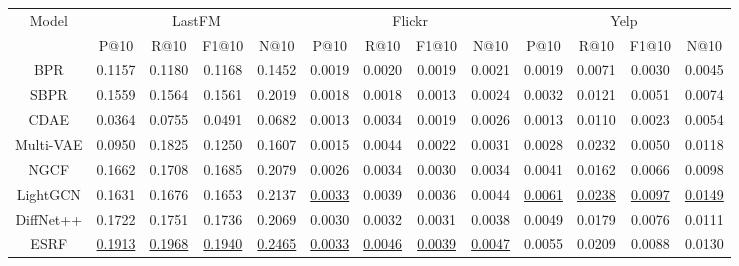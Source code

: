 \documentclass[letterpaper]{article} %
\begin{document}
\begin{table}[ht]\small
    \begin{tabular*}{\textwidth}{@{\extracolsep{\fill}}ccccc|cccc|cccc}
        \cmidrule(l){1-13}
        \multirow{2}{*}{Model} & \multicolumn{4}{c}{LastFM} & \multicolumn{4}{c}{Flickr} & \multicolumn{4}{c}{Yelp} \\ \cmidrule(l){2-5} \cmidrule(l){6-9} \cmidrule(l){10-13} \cmidrule(l){10-13}
            & P@10  & R@10  & F1@10  & N@10 & P@10  & R@10 & F1@10  & N@10 & P@10 & R@10 & F1@10  & N@10 \\ \cmidrule(l){1-13}
            BPR             &0.1157 &0.1180 &0.1168 &0.1452     &0.0019 &0.0020 &0.0019 &0.0021     &0.0019 &0.0071 &0.0030 &0.0045\\
            
            SBPR            &0.1559 &0.1564 &0.1561 &0.2019     &0.0018 &0.0018 &0.0013 &0.0024     &0.0032 &0.0121 &0.0051 &0.0074\\ \cmidrule(l){1-13}
            
            CDAE        &0.0364 &0.0755 &0.0491 &0.0682     &0.0013 &0.0034 &0.0019 &0.0026     &0.0013 &0.0110 &0.0023 &0.0054 \\
            
            Multi-VAE   &0.0950 &0.1825 &0.1250 &0.1607     &0.0015 &0.0044&0.0022 &0.0031     &0.0028 &0.0232 &0.0050 &0.0118 \\ \cmidrule(l){1-13}
            
            NGCF        &0.1662 &0.1708 &0.1685 &0.2079     &0.0026 &0.0034 &0.0030 &0.0034     &0.0041 &0.0162 &0.0066 &0.0098 \\
            
            LightGCN        &0.1631 &0.1676 &0.1653 &0.2137     &\underline{0.0033} &0.0039 &0.0036 &0.0044     &\underline{0.0061} &\underline{0.0238} &\underline{0.0097} &\underline{0.0149} \\ \cmidrule(l){1-13}
            
            DiffNet++            &0.1722 &0.1751 &0.1736 &0.2069     &0.0030 &0.0032 &0.0031 &0.0038     &0.0049 &0.0179 &0.0076 &0.0111\\
            
            ESRF            &\underline{0.1913}  &\underline{0.1968} &\underline{0.1940} &\underline{0.2465}    &\underline{0.0033} &\underline{0.0046} &\underline{0.0039} &\underline{0.0047}     &0.0055 &0.0209 &0.0088 &0.0130\\ \cmidrule(l){1-13}
            

\end{tabular*}
\end{table}
\end{document}
